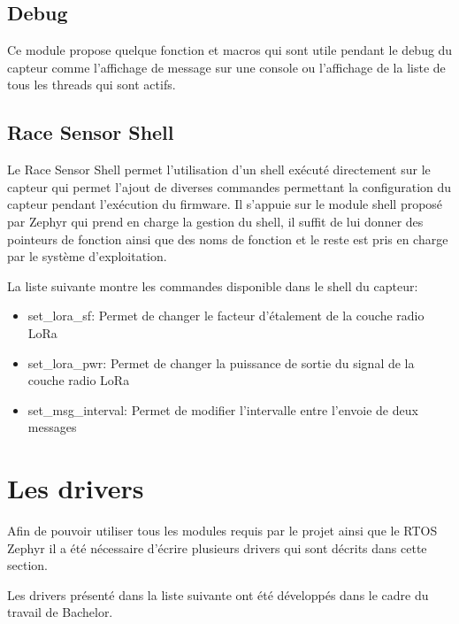 \subsection{Debug}

Ce module propose quelque fonction et macros qui sont utile pendant le debug du capteur comme l'affichage de message sur une console ou l'affichage de la liste de tous les threads qui sont actifs.

\subsection{Race Sensor Shell}

Le Race Sensor Shell permet l'utilisation d'un shell exécuté directement sur le capteur qui permet l'ajout de diverses commandes permettant la configuration du capteur pendant l'exécution du firmware. Il s'appuie sur le module shell proposé par Zephyr qui prend en charge la gestion du shell, il suffit de lui donner des pointeurs de fonction ainsi que des noms de fonction et le reste est pris en charge par le système d'exploitation.

La liste suivante montre les commandes disponible dans le shell du capteur:

\begin{itemize}
\item set\_lora\_sf: Permet de changer le facteur d'étalement de la couche radio LoRa
\item set\_lora\_pwr: Permet de changer la puissance de sortie du signal de la couche radio LoRa
\item set\_msg\_interval: Permet de modifier l'intervalle entre l'envoie de deux messages
\end{itemize}

\section{Les drivers}\label{ch:drivers}

Afin de pouvoir utiliser tous les modules requis par le projet ainsi que le RTOS Zephyr il a été nécessaire d'écrire plusieurs drivers qui sont décrits dans cette section.

Les drivers présenté dans la liste suivante ont été développés dans le cadre du travail de Bachelor.

